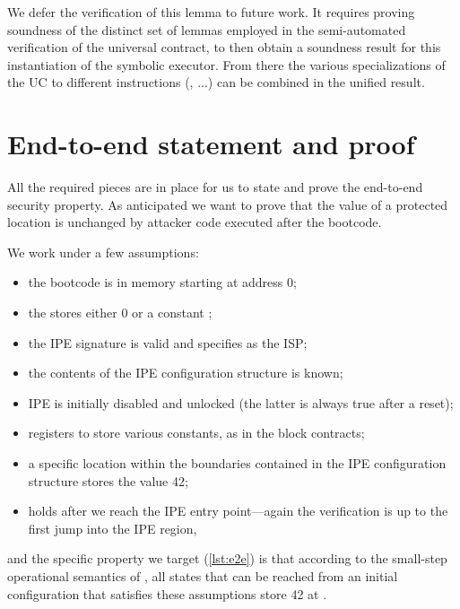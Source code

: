 We defer the verification of this lemma to future work. It requires proving soundness of the distinct set of lemmas employed in the semi-automated verification of the universal contract, to then obtain a soundness result for this instantiation of the symbolic executor. From there the various specializations of the UC to different instructions (, ...) can be combined in the unified  result.

\section{End-to-end statement and proof}

All the required pieces are in place for us to state and prove the end-to-end security property. As anticipated we want to prove that the value of a protected location is unchanged by attacker code executed after the bootcode.

We work under a few assumptions:
\begin{itemize}
\item the bootcode is in memory starting at address 0;
\item the  stores either 0 or a constant ;
\item the IPE signature is valid and specifies  as the ISP;
\item the contents of the IPE configuration structure is known;
\item IPE is initially disabled and unlocked (the latter is always true after a reset);
\item registers  to  store various constants, as in the block contracts;
\item a specific location  within the boundaries contained in the IPE configuration structure stores the value 42;
\item {} holds after we reach the IPE entry point---again the verification is up to the first jump into the IPE region,
\end{itemize}
and the specific property we target (\cref{lst:e2e}) is that according to the small-step operational semantics of \usail, all states that can be reached from an initial configuration that satisfies these assumptions store 42 at .

